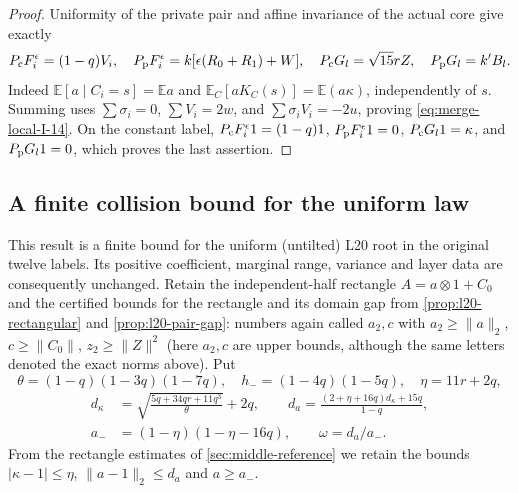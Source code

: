 \begin{proof}
Uniformity of the private pair and affine invariance of the actual
core give exactly
\[
 P_{\rm c}F_i^\epsilon=(1-q)V_i,\quad
 P_{\rm p}F_i^\epsilon=k[\epsilon(R_0+R_1)+W],\quad
 P_{\rm c}G_l=\sqrt{15}rZ,\quad P_{\rm p}G_l=k'B_l.
\]
Indeed $\mathbb E[a\mid C_i=s]=\mathbb E a$ and
$\mathbb E_C[aK_C(s)]=\mathbb E(a\kappa)$, independently of $s$.
Summing uses $\sum\sigma_i=0$, $\sum V_i=2w$, and
$\sum\sigma_iV_i=-2u$, proving \eqref{eq:merge-local-I-14}.  On the constant label,
$P_{\rm c}F_i^\epsilon1=(1-q)1$, $P_{\rm p}F_i^\epsilon1=0$,
$P_{\rm c}G_l1=\kappa$, and $P_{\rm p}G_l1=0$, which proves the last assertion.
\end{proof}

\subsection{A finite collision bound for the uniform law}
\label{imp:local:finite-collision-section}

This result is a finite bound for the uniform (untilted) L20 root in the original twelve labels.
Its positive coefficient, marginal range, variance and layer data
are consequently unchanged. Retain the independent-half rectangle
$A=a\otimes1+C_0$ and the certified bounds for the rectangle
and its domain gap from \cref{prop:l20-rectangular} and
\cref{prop:l20-pair-gap}: numbers again called $a_2,c$ with
$a_2\ge\|a\|_2$, $c\ge\|C_0\|$, $z_2\ge\|Z\|^2$ (here $a_2,c$
are upper bounds, although the same letters denoted the exact
norms above).
Put
\[
 \theta=(1-q)(1-3q)(1-7q),\quad h_-=(1-4q)(1-5q),
 \quad \eta=11r+2q,
\]
\begin{equation}\label{eq:merge-local-I-15}
 \begin{aligned}
 d_\kappa&=\sqrt{\frac{5q+34qr+11q^3}{\theta}}+2q,\qquad
 d_a=\frac{(2+\eta+16q)d_\kappa+15q}{1-q},\\
 a_-&=(1-\eta)(1-\eta-16q),\qquad \omega=d_a/a_-.
 \end{aligned}
\end{equation}
From the rectangle estimates of \cref{sec:middle-reference} we
retain the bounds $|\kappa-1|\le\eta$, $\|a-1\|_2\le d_a$ and
$a\ge a_-$.

